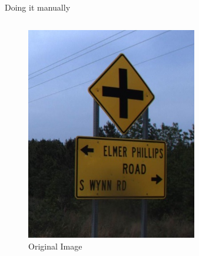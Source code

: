 \documentclass{beamer}
\begin{document}
\begin{frame}{Doing it manually}
  \begin{columns}
  \begin{column}{0.15\textwidth}
    \begin{figure}
        \centering
        \includegraphics[width=\linewidth]{figures/manual_filters/base_image.jpg}
        \caption{Original Image}
    \end{figure}{}
  \end{column}
  \begin{column}{0.85\textwidth}
  \begin{figure}
      \centering
      \begin{subfigure}[b]{0.22\textwidth}

\end{subfigure}
\end{figure}
\end{column}
\end{columns}
\end{frame}
\end{document}
